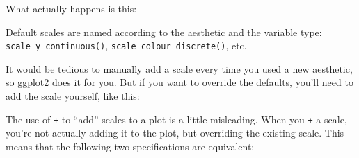 What actually happens is this:

\begin{Shaded}
\begin{Highlighting}[]
\StringTok{ }
\StringTok{  }\NormalTok{(}\NormalTok{(} 
\StringTok{  }\NormalTok{() +}\StringTok{ }
\StringTok{  }\NormalTok{() +}\StringTok{ }
\StringTok{  }\NormalTok{()}
\end{Highlighting}
\end{Shaded}

Default scales are named according to the aesthetic and the variable
type: \texttt{scale\_y\_continuous()},
\texttt{scale\_colour\_discrete()}, etc.

It would be tedious to manually add a scale every time you used a new
aesthetic, so ggplot2 does it for you. But if you want to override the
defaults, you'll need to add the scale yourself, like this:

\begin{Shaded}
\begin{Highlighting}[]
\StringTok{ }
\StringTok{  }\NormalTok{(}\NormalTok{(} \StringTok{ }
\StringTok{  }\NormalTok{(}\NormalTok{) +}
\StringTok{  }\NormalTok{(}\NormalTok{)}
\end{Highlighting}
\end{Shaded}

The use of \texttt{+} to ``add'' scales to a plot is a little
misleading. When you \texttt{+} a scale, you're not actually adding it
to the plot, but overriding the existing scale. This means that the
following two specifications are equivalent: \indexc{+}

\begin{Shaded}
\begin{Highlighting}[]
\StringTok{ }
\StringTok{  }\NormalTok{() +}\StringTok{ }
\StringTok{  }\NormalTok{(}\NormalTok{) +}
\StringTok{  }\NormalTok{(}\NormalTok{)}

\StringTok{ }
\StringTok{  }\NormalTok{() +}\StringTok{ }
\StringTok{  }\NormalTok{(}\NormalTok{)}
\end{Highlighting}
\end{Shaded}

